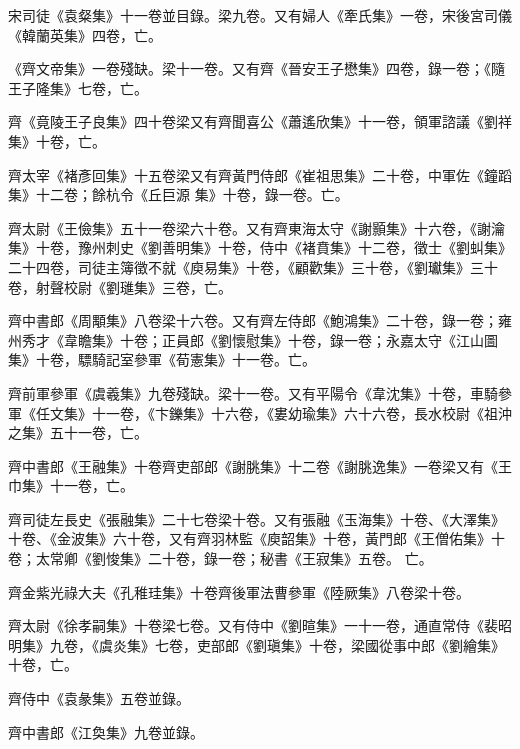 \begin{pinyinscope}
 宋司徒《袁粲集》十一卷並目錄。梁九卷。又有婦人《牽氏集》一卷，宋後宮司儀《韓蘭英集》四卷，亡。



 《齊文帝集》一卷殘缺。梁十一卷。又有齊《晉安王子懋集》四卷，錄一卷；《隨王子隆集》七卷，亡。



 齊《竟陵王子良集》四十卷梁又有齊聞喜公《蕭遙欣集》十一卷，領軍諮議《劉祥集》十卷，亡。



 齊太宰《褚彥回集》十五卷梁又有齊黃門侍郎《崔祖思集》二十卷，中軍佐《鐘蹈集》十二卷；餘杭令《丘巨源
 集》十卷，錄一卷。亡。



 齊太尉《王儉集》五十一卷梁六十卷。又有齊東海太守《謝顥集》十六卷，《謝瀹集》十卷，豫州刺史《劉善明集》十卷，侍中《褚賁集》十二卷，徵士《劉虯集》二十四卷，司徒主簿徵不就《庾易集》十卷，《顧歡集》三十卷，《劉瓛集》三十卷，射聲校尉《劉璡集》三卷，亡。



 齊中書郎《周顒集》八卷梁十六卷。又有齊左侍郎《鮑鴻集》二十卷，錄一卷；雍州秀才《韋瞻集》十卷；正員郎《劉懷慰集》十卷，錄一卷；永嘉太守《江山圖集》十卷，驃騎記室參軍《荀憲集》十一卷。亡。



 齊前軍參軍《虞羲集》九卷殘缺。梁十一卷。又有平陽令《韋沈集》十卷，車騎參軍《任文集》十一卷，《卞鑠集》十六卷，《婁幼瑜集》六十六卷，長水校尉《祖沖之集》五十一卷，亡。



 齊中書郎《王融集》十卷齊吏部郎《謝朓集》十二卷《謝朓逸集》一卷梁又有《王巾集》十一卷，亡。



 齊司徒左長史《張融集》二十七卷梁十卷。又有張融《玉海集》十卷、《大澤集》十卷、《金波集》六十卷，又有齊羽林監《庾韶集》十卷，黃門郎《王僧佑集》十卷；太常卿《劉悛集》二十卷，錄一卷；秘書《王寂集》五卷。
 亡。



 齊金紫光祿大夫《孔稚珪集》十卷齊後軍法曹參軍《陸厥集》八卷梁十卷。



 齊太尉《徐孝嗣集》十卷梁七卷。又有侍中《劉暄集》一十一卷，通直常侍《裴昭明集》九卷，《虞炎集》七卷，吏部郎《劉瑱集》十卷，梁國從事中郎《劉繪集》十卷，亡。



 齊侍中《袁彖集》五卷並錄。



 齊中書郎《江奐集》九卷並錄。




\end{pinyinscope}
